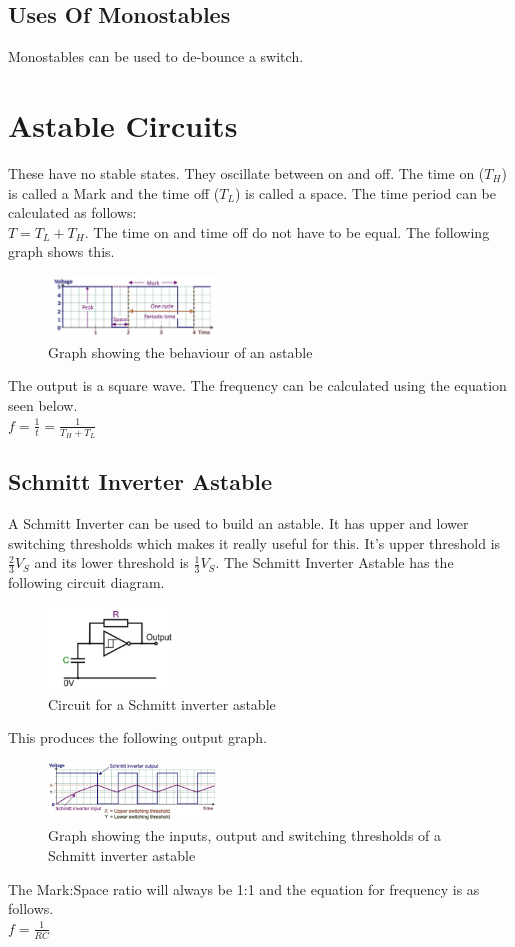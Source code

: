 \documentclass[a4paper,11pt, twocolumn]{article}
\begin{document}
\subsection{Uses Of Monostables}
Monostables can be used to de-bounce a switch. 

\section{Astable Circuits}
These have no stable states. They oscillate between on and off. The time on ($T_H$) is called a Mark and the time off ($T_L$) is called a space. The time period can be calculated as follows:\\
$T = T_L + T_H$. The time on and time off do not have to be equal. The following graph shows this.
\begin{figure}[H]
    \centering
    \includegraphics[width=0.4\textwidth]{images/astable.jpg}
    \caption{Graph showing the behaviour of an astable}
    \label{fig:astable}
\end{figure}
\noindent The output is a square wave. The frequency can be calculated using the equation seen below.\\
$\displaystyle f = \frac{1}{t} = \frac{1}{T_H + T_L}$
\subsection{Schmitt Inverter Astable}
A Schmitt Inverter can be used to build an astable. It has upper and lower switching thresholds which makes it really useful for this. It's upper threshold is $\frac{2}{3}V_S$ and its lower threshold is $\frac{1}{3}V_S$. The Schmitt Inverter Astable has the following circuit diagram.
\begin{figure}[H]
    \centering
    \includegraphics[width=0.3\textwidth]{images/astaSchmitt.jpg}
    \caption{Circuit for a Schmitt inverter astable}
    \label{fig:astaSchmitt}
\end{figure}
\noindent This produces the following output graph.
\begin{figure}[H]
    \centering
    \includegraphics[width=0.4\textwidth]{images/astaSchmittGraph.jpg}
    \caption{Graph showing the inputs, output and switching thresholds of a Schmitt inverter astable}
    \label{fig:astaSchmittGraph}
\end{figure}
\noindent The Mark:Space ratio will always be 1:1 and the equation for frequency is as follows.\\
$\displaystyle f = \frac{1}{RC}$
\end{document}
